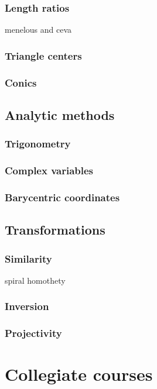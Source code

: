 \documentclass{../../large}
\begin{document}
\section{Length ratios}
menelous and ceva

\section{Triangle centers}

\section{Conics}



\chapter{Analytic methods}
\section{Trigonometry}
\section{Complex variables}
\section{Barycentric coordinates}



\chapter{Transformations}
\section{Similarity}
spiral homothety

\section{Inversion}

\section{Projectivity}




\part{Collegiate courses}
\end{document}

